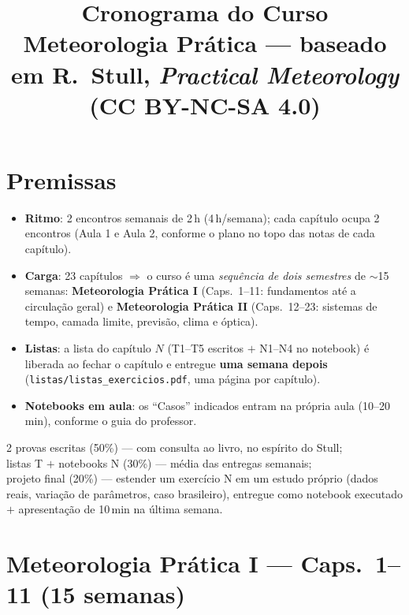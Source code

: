 \documentclass[11pt]{article}
\title{Cronograma do Curso\\
{\large Meteorologia Prática --- baseado em R.~Stull,
\emph{Practical Meteorology} (CC BY-NC-SA 4.0)}}
\author{}
\date{}
\begin{document}
\maketitle
\thispagestyle{fancy}

\section*{Premissas}

\begin{itemize}
  \item \textbf{Ritmo}: 2 encontros semanais de 2\,h (4\,h/semana);
        cada capítulo ocupa 2 encontros (Aula 1 e Aula 2, conforme o
        plano no topo das notas de cada capítulo).
  \item \textbf{Carga}: 23 capítulos $\Rightarrow$ o curso é uma
        \emph{sequência de dois semestres} de $\sim$15 semanas:
        \textbf{Meteorologia Prática I} (Caps.~1--11: fundamentos até
        a circulação geral) e \textbf{Meteorologia Prática II}
        (Caps.~12--23: sistemas de tempo, camada limite, previsão,
        clima e óptica).
  \item \textbf{Listas}: a lista do capítulo $N$ (T1--T5 escritos $+$
        N1--N4 no notebook) é liberada ao fechar o capítulo e
        entregue \textbf{uma semana depois}
        (\texttt{listas/listas\_exercicios.pdf}, uma página por
        capítulo).
  \item \textbf{Notebooks em aula}: os ``Casos'' indicados entram na
        própria aula (10--20\,min), conforme o guia do professor.
\end{itemize}

\begin{noquadro}
2 provas escritas (50\%) --- com consulta ao livro, no espírito do
Stull;\\
listas T $+$ notebooks N (30\%) --- média das entregas semanais;\\
projeto final (20\%) --- estender um exercício N em um estudo próprio
(dados reais, variação de parâmetros, caso brasileiro), entregue como
notebook executado $+$ apresentação de 10\,min na última semana.
\end{noquadro}

\clearpage
\section*{Meteorologia Prática I --- Caps.~1--11 (15 semanas)}
\end{document}
